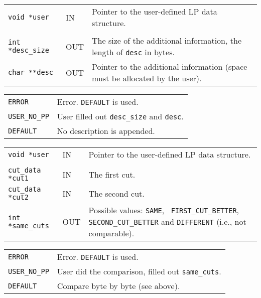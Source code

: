 \documentclass[twoside,11pt]{article}
\begin{document}
{\newpage
\clearpage
\samepage \begin{tabular}{llp{275pt}}
{\tt void *user} & IN & Pointer to the user-defined LP data structure. \\ 
& & \\ 
{\tt int *desc\_size} & OUT & The size of the additional information, the
length of {\tt *desc} in bytes. \\ 
{\tt char **desc} & OUT & Pointer to the additional information (space must be
allocated by the user).\\ 
\end{tabular}
}

{\newpage
\clearpage
\samepage \begin{tabular}{lp{300pt}}
{\tt ERROR} & Error. {\tt DEFAULT} is used. \\ 
{\tt USER\_NO\_PP} & User filled out {\tt *desc\_size} and {\tt *desc}.\\ 
{\tt DEFAULT} & No description is appended. \\ 
\end{tabular}
}

{\newpage
\clearpage
\samepage \begin{tabular}{llp{275pt}}
{\tt void *user} & IN & Pointer to the user-defined LP data structure.\\ 
& & \\ 
{\tt cut\_data *cut1} & IN & The first cut.\\ 
{\tt cut\_data *cut2} & IN & The second cut.\\ 
{\tt int *same\_cuts} & OUT & Possible values: {\tt SAME}, {\tt
FIRST\_CUT\_BETTER}, {\tt SECOND\_CUT\_BETTER} and {\tt DIFFERENT} (i.e., not
comparable).\\ 
\end{tabular}
}

{\newpage
\clearpage
\samepage \begin{tabular}{lp{295.386pt}}
{\tt ERROR} & Error. {\tt DEFAULT} is used.\\ 
{\tt USER\_NO\_PP} & User did the comparison, filled out {\tt *same\_cuts}. \\ 
{\tt DEFAULT} & Compare byte by byte (see above). \\ 
\end{tabular}
}
\end{document}
